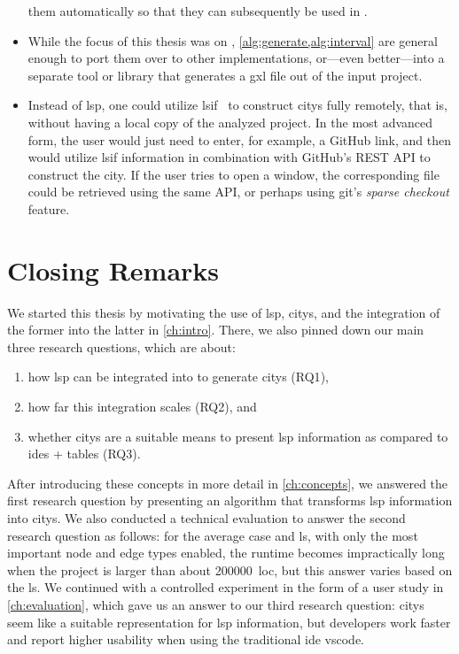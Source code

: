\documentclass[../thesis]{subfiles}
\begin{document}
\begin{itemize}
{	      } them automatically so that they can subsequently be used in \SEE{}.
	\item While the focus of this thesis was on \SEE{}, \cref{alg:generate,alg:interval} are general enough to port them over to other  implementations, or---even better---into a separate tool or library that generates a \gls{gxl} file out of the input project.
	\item Instead of \gls{lsp}, one could utilize \gls{lsif}~\cite{lsif} to construct \glspl{city} fully remotely, that is, without having a local copy of the analyzed project.
	      In the most advanced form, the user would just need to enter, for example, a GitHub link, and then \SEE{} would utilize \gls{lsif} information in combination with GitHub's REST API to construct the city.
	      If the user tries to open a \gls{window}, the corresponding file could be retrieved using the same API, or perhaps using git's \emph{sparse checkout} feature.
\end{itemize}

\setlength\parskip{0.5\baselineskip plus 2pt}
\section{Closing Remarks}
We started this thesis by motivating the use of \gls{lsp}, \glspl{city}, and the integration of the former into the latter in \cref{ch:intro}.
There, we also pinned down our main three research questions, which are about:
\begin{enumerate}
	\item how \gls{lsp} can be integrated into \SEE{} to generate \glspl{city} (\textsf{RQ1}),
	\item how far this integration scales (\textsf{RQ2}), and
	\item whether \glspl{city} are a suitable means to present \gls{lsp} information as compared to \glspl{ide} + tables (\textsf{RQ3}).
\end{enumerate}
After introducing these concepts in more detail in \cref{ch:concepts}, we answered the first research question by presenting an algorithm that transforms \gls{lsp} information into \glspl{city}.
We also conducted a technical evaluation to answer the second research question as follows: for the average case and \gls{ls}, with only the most important node and edge types enabled, the runtime becomes impractically long when the project is larger than about \qty{200000}{\gls{loc}}, but this answer varies based on the \gls{ls}.
We continued with a controlled experiment in the form of a user study in \cref{ch:evaluation}, which gave us an answer to our third research question:
\glspl{city} seem like a suitable representation for \gls{lsp} information, but developers work faster and report higher usability when using the traditional \gls{ide} \gls{vscode}.
\end{document}
